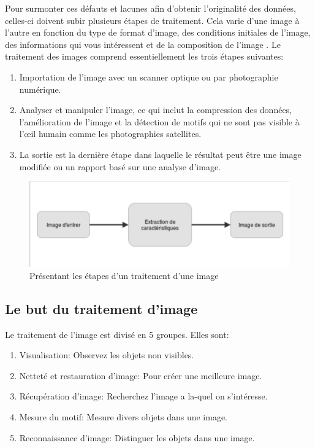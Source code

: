 \documentclass[12pt]{article}
\begin{document}
Pour surmonter ces défauts et lacunes afin d'obtenir l'originalité des données, celles-ci doivent subir plusieurs étapes de traitement. Cela varie d'une image à l'autre en fonction du type de format d'image, des conditions initiales de l'image, des informations qui vous intéressent et de la composition de l'image \cite{14}.
Le traitement des images comprend essentiellement les trois étapes suivantes:
\begin{enumerate}
	\item Importation de l'image avec un scanner optique ou par photographie numérique.
	\item Analyser et manipuler l'image, ce qui inclut la compression des données, l'amélioration de l'image et la détection de motifs qui ne sont pas visible à l’œil humain comme les photographies satellites.
	\item La sortie est la dernière étape dans laquelle le résultat peut être une image modifiée ou un rapport basé sur une analyse d'image.
\end{enumerate}
\begin{figure}[h]
\centering
\includegraphics[scale=1, width=13cm]{img-Chapiter-1/1.png}
\caption{Présentant les étapes d’un traitement d’une image}
\end{figure}

\subsection{Le but du traitement d'image}
Le traitement de l'image est divisé en 5 groupes. Elles sont:
\begin{enumerate}
	\item Visualisation: Observez les objets non visibles.
	\item Netteté et restauration d'image: Pour créer une meilleure image.
	\item Récupération d'image: Recherchez l'image a la-quel on s’intéresse.
	\item Mesure du motif: Mesure divers objets dans une image.
	\item Reconnaissance d'image: Distinguer les objets dans une image.
\end{enumerate}
\end{document}
